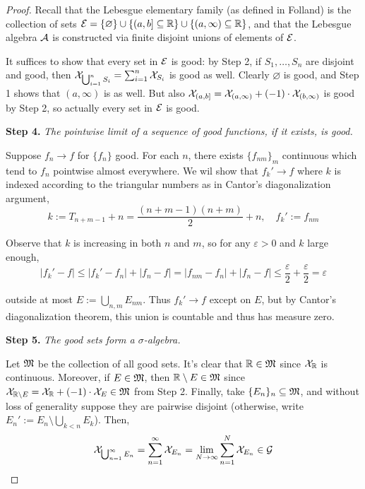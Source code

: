 \begin{proof}
    Recall that the Lebesgue elementary family (as defined in Folland) is the collection of sets $\mathcal{E} = \{ \varnothing \} \cup \{ (a, b] \subseteq \mathbb{R} \} \cup \{ (a, \infty) \subseteq \mathbb{R} \}$, and that the Lebesgue algebra $\mathcal{A}$ is constructed via finite disjoint unions of elements of $\mathcal{E}$. 
    
    It suffices to show that every set in $\mathcal{E}$ is good: by Step 2, if $S_1, \dots, S_n$ are disjoint and good, then $\mathcal{X}_{\bigcup_{i=1}^n S_i} = \sum_{i=1}^n \mathcal{X}_{S_i}$ is good as well. Clearly $\varnothing$ is good, and Step 1 shows that $(a, \infty)$ is as well. But also $\mathcal{X}_{(a, b]} = \mathcal{X}_{(a, \infty)} + (-1) \cdot \mathcal{X}_{(b, \infty)}$ is good by Step 2, so actually every set in $\mathcal{E}$ is good. 

    \textbf{Step 4.} \textit{The pointwise limit of a sequence of good functions, if it exists, is good.}

    Suppose $f_n \to f$ for $\{f_n\}$ good. For each $n$, there exists $\{f_{nm}\}_m$ continuous which tend to $f_n$ pointwise almost everywhere. We wil show that $f_k' \to f$ where $k$ is indexed according to the triangular numbers as in Cantor's diagonalization argument, 
    $$
    k := T_{n+m-1} + n = \frac{(n+m-1)(n+m)}{2} + n, 
    \quad 
    f_k' := f_{nm}
    $$
    
    Observe that $k$ is increasing in both $n$ and $m$, so for any $\varepsilon > 0$ and $k$ large enough, 
    $$
    |f_k' - f| 
    \leq |f_k' - f_n| + |f_n - f|
    = |f_{nm} - f_n| + |f_n - f|
    \leq \frac{\varepsilon}{2} + \frac{\varepsilon}{2}
    = \varepsilon
    $$

    outside at most $E := \bigcup_{n,m} E_{nm}$. Thus $f_k' \to f$ except on $E$, but by Cantor's diagonalization theorem, this union is countable and thus has measure zero. 

    \textbf{Step 5.} \textit{The good sets form a $\sigma$-algebra.}

    Let $\mathfrak{M}$ be the collection of all good sets. It's clear that $\mathbb{R} \in \mathfrak{M}$ since $\mathcal{X}_{\mathbb{R}}$ is continuous. Moreover, if $E \in \mathfrak{M}$, then $\mathbb{R} \setminus E \in \mathfrak{M}$ since $\mathcal{X}_{\mathbb{R} \setminus E} = \mathcal{X}_{\mathbb{R}} + (-1) \cdot \mathcal{X}_E \in \mathfrak{M}$ from Step 2. Finally, take $\{E_n\}_n \subseteq \mathfrak{M}$, and without loss of generality suppose they are pairwise disjoint (otherwise, write $E_n' := E_n \setminus \bigcup_{k<n}E_k$). Then, 
    $$
    \mathcal{X}_{\bigcup_{n=1}^\infty E_n} 
    = \sum_{n=1}^\infty \mathcal{X}_{E_n} 
    = \lim_{N \to \infty} \sum_{n=1}^N \mathcal{X}_{E_n}
    \in \mathcal{G}
    $$


\end{proof}
